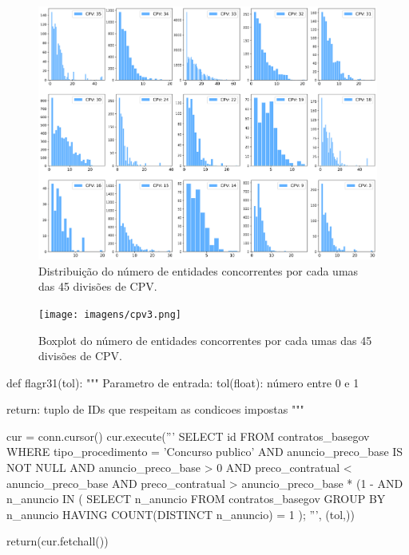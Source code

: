 \begin{figure}[H]
	\centering
	\includegraphics[width=\textwidth]{imagens/r019_hist3.png}
	\caption{Distribuição do número de entidades concorrentes por cada umas das 45 divisões de CPV.}
	\label{fig:distisnec}
\end{figure}

\begin{figure}[H]
	\centering
	\texttt{[image: imagens/cpv3.png]}
	\caption{Boxplot do número de entidades concorrentes por cada umas das 45 divisões de CPV.}
	\label{fig:boxplotsnec}
\end{figure}


\begin{code}[caption={Código em Python referente à flag R031.},captionpos=b,label=lst:r31,
	language=python,
	showspaces=false,
	showstringspaces=false,
	basicstyle=\ttfamily,
	numbers=left,
	numberstyle=\tiny,
	commentstyle=\color{gray}, 
	frame=single,
	autogobble=true,
	breaklines=true,
	postbreak=\mbox{\textcolor{red}{$\hookrightarrow$}\space},
	]
	def flagr31(tol):
	"""
	Parametro de entrada:
	tol(float): número entre 0 e 1
	
	return: tuplo de IDs que respeitam as condicoes impostas
	"""
	
	cur = conn.cursor()
	cur.execute('''
	SELECT id
	FROM contratos_basegov
	WHERE tipo_procedimento = 'Concurso publico' 
	AND anuncio_preco_base IS NOT NULL 
	AND anuncio_preco_base > 0 
	AND preco_contratual < anuncio_preco_base 
	AND preco_contratual > anuncio_preco_base * (1 - %
	AND n_anuncio IN (
	SELECT n_anuncio
	FROM contratos_basegov
	GROUP BY n_anuncio
	HAVING COUNT(DISTINCT n_anuncio) = 1
	);
	''', (tol,))
	
	return(cur.fetchall())
	
\end{code}



